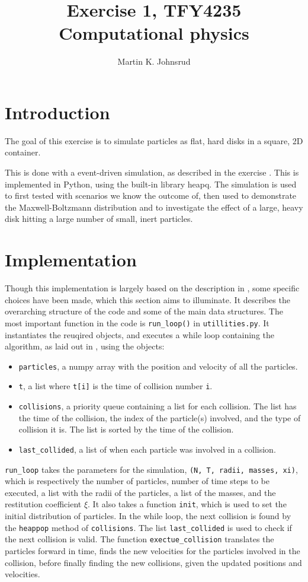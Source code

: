 \documentclass{article}
\title{Exercise 1, TFY4235 Computational physics}
\author{Martin K. Johnsrud}
\date{}
\begin{document}
    \maketitle
    \section*{Introduction}
    The goal of this exercise is to simulate particles as flat, hard disks in a square, 2D container.

    This is done with a event-driven simulation, as described in the exercise \cite{exercise}.
    This is implemented in Python, using the built-in library heapq.
    The simulation is used to first tested with scenarios we know the outcome of, then used to demonstrate the Maxwell-Boltzmann distribution and to investigate the effect of a large, heavy disk hitting a large number of small, inert particles.

    \section*{Implementation}
    Though this implementation is largely based on the description in \cite{exercise}, some specific choices have been made, which this section aims to illuminate.
    It describes the overarching structure of the code and some of the main data structures.
    The most important function in the code is \verb|run_loop()| in \verb|utillities.py|.
    It instantiates the reuqired objects, and executes a while loop containing the algorithm, as laid out in \cite{exercise}, using the objects:
    \begin{itemize}
        \item \verb|particles|, a numpy array with the position and velocity of all the particles.
        \item \verb|t|, a list where \verb|t[i]| is the time of collision number \verb|i|.
        \item \verb|collisions|, a priority queue containing a list for each collision.
        The list has the time of the collision, the index of the particle(s) involved, and the type of collision it is.
        The list is sorted by the time of the collision.
        \item \verb|last_collided|, a list of when each particle was involved in a collision.
    \end{itemize}
    \verb|run_loop| takes the parameters for the simulation, \verb|(N, T, radii, masses, xi)|, which is respectively the number of particles, number of time steps to be executed, a list with the radii of the particles, a list of the masses, and the restitution coefficient $\xi$.
    It also takes a function \verb|init|, which is used to set the initial distribution of particles.
    In the while loop, the next collision is found by the \verb|heappop| method of \verb|collisions|.
    The list \verb|last_collided| is used to check if the next collision is valid.
    The function \verb|exectue_collision| translates the particles forward in time, finds the new velocities for the particles involved in the collision, before finally finding the new collisions, given the updated positions and velocities.
\end{document}
